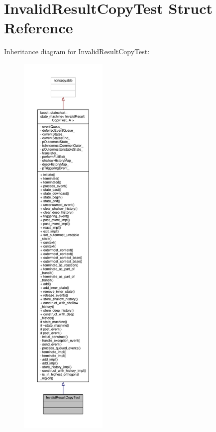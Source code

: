 \hypertarget{struct_invalid_result_copy_test}{}\section{Invalid\+Result\+Copy\+Test Struct Reference}
\label{struct_invalid_result_copy_test}


Inheritance diagram for Invalid\+Result\+Copy\+Test\+:
\nopagebreak
\begin{figure}[H]
\begin{center}
\leavevmode
\includegraphics[height=550pt]{struct_invalid_result_copy_test__inherit__graph}
\end{center}
\end{figure}


